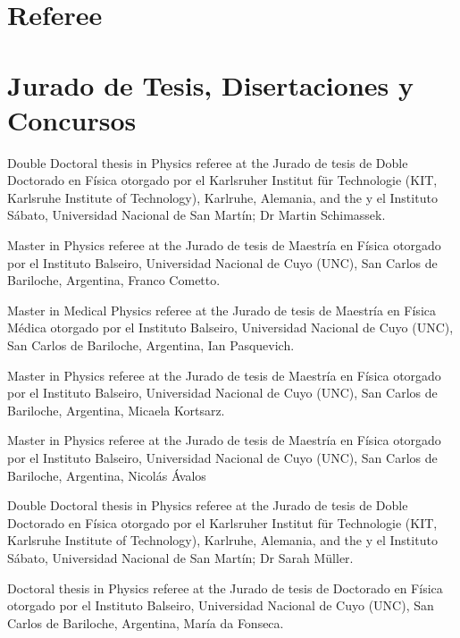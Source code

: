 

\ifeng
  \section*{Referee}
\else
  \section*{Jurado de Tesis, Disertaciones y Concursos}
\fi

\ifeng
Double Doctoral thesis in Physics referee at the
\else
Jurado de tesis de Doble Doctorado en Física otorgado por el
\fi
Karlsruher Institut für Technologie (KIT, Karlsruhe Institute of Technology), Karlruhe, Alemania, \ifeng and the \else y el \fi Instituto Sábato, Universidad Nacional de San Martín; Dr Martin Schimassek.

\ifeng
Master in Physics referee at the 
\else
Jurado de tesis de Maestría en Física otorgado por el
\fi
Instituto Balseiro, Universidad Nacional de Cuyo (UNC), San Carlos de Bariloche, Argentina, Franco Cometto. 

\ifeng
Master in Medical Physics referee at the 
\else
Jurado de tesis de Maestría en Física Médica otorgado por el
\fi
Instituto Balseiro, Universidad Nacional de Cuyo (UNC), San Carlos de Bariloche, Argentina, Ian Pasquevich. 

\ifeng
Master in Physics referee at the 
\else
Jurado de tesis de Maestría en Física otorgado por el
\fi
Instituto Balseiro, Universidad Nacional de Cuyo (UNC), San Carlos de Bariloche, Argentina, Micaela Kortsarz. 

\ifeng
Master in Physics referee at the 
\else
Jurado de tesis de Maestría en Física otorgado por el
\fi
Instituto Balseiro, Universidad Nacional de Cuyo (UNC), San Carlos de Bariloche, Argentina, Nicolás Ávalos

\ifeng
Double Doctoral thesis in Physics referee at the
\else
Jurado de tesis de Doble Doctorado en Física otorgado por el
\fi
Karlsruher Institut für Technologie (KIT, Karlsruhe Institute of Technology), Karlruhe, Alemania, \ifeng and the \else y el \fi Instituto Sábato, Universidad Nacional de San Martín; Dr Sarah Müller.

\ifeng
Doctoral thesis in Physics referee at the 
\else
Jurado de tesis de Doctorado en Física otorgado por el
\fi
Instituto Balseiro, Universidad Nacional de Cuyo (UNC), San Carlos de Bariloche, Argentina, María da Fonseca.

